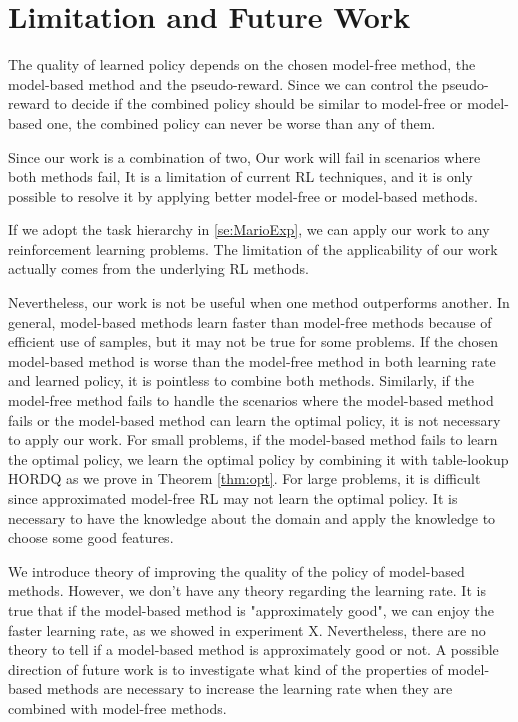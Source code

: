 \section{Limitation and Future Work}

The quality of learned policy depends on the chosen model-free method,
the model-based method and the pseudo-reward. 
Since we can control the pseudo-reward to decide if the combined
policy should be similar to model-free or model-based one,
the combined policy can never be worse than any of them. 

Since our work is a combination of two,  Our work will fail in scenarios where both methods fail, 
It is a limitation of current RL techniques, and it is only possible to 
resolve it by applying better model-free or model-based methods. 

If we adopt the task hierarchy in \ref{se:MarioExp}, we can apply our work
to any reinforcement learning problems.  
The limitation of the applicability
of our work actually comes from the underlying RL methods. 

Nevertheless, our work is not be useful when one method outperforms another.
In general, model-based methods learn faster than model-free methods because of
efficient use of samples, but it may not be true for some problems. 
If the chosen model-based method is worse than the model-free method in both learning
rate and learned policy, it is pointless to combine both methods. 
Similarly, if the model-free method fails to handle the scenarios where the model-based
method fails or the model-based method can learn the optimal policy, it is not necessary to apply our work.
For small problems, if the model-based method fails to learn the optimal policy, 
we learn the optimal policy by combining it with table-lookup HORDQ as we prove in Theorem \ref{thm:opt}.
For large problems, it is difficult since approximated model-free RL may not learn the optimal policy.
It is necessary to have the knowledge about the domain and apply the knowledge to choose some good features.

We introduce theory of improving the quality of the policy of model-based methods.
However, we don't have any theory regarding the learning rate. 
It is true that if the model-based method is "approximately good", we can enjoy the 
faster learning rate, as we showed in experiment X. Nevertheless, there are no theory
to tell if a model-based method is approximately good or not.
A possible direction of future work is to investigate what kind of the properties of model-based
methods are necessary to increase the learning rate when they are combined with model-free methods.





